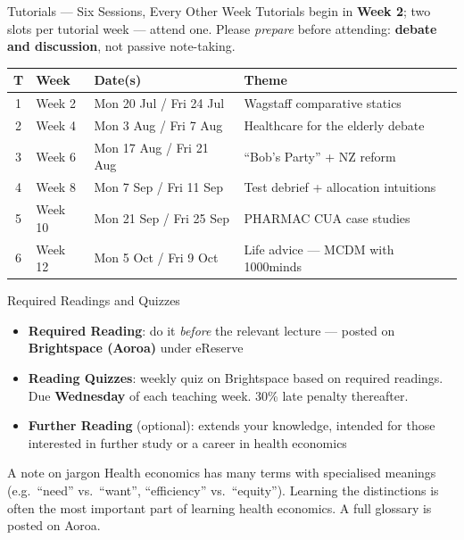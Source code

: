 \documentclass[aspectratio=169, 12pt]{beamer}
\begin{document}
\begin{frame}{Tutorials --- Six Sessions, Every Other Week}
  \small
  Tutorials begin in \textbf{Week 2}; two slots per tutorial week --- attend one.
  Please \emph{prepare} before attending: \textbf{debate and discussion}, not passive note-taking.

  \vspace{0.3em}
  \begin{center}
  \begin{tabular}{@{}clll@{}}
    \toprule
    \textbf{T} & \textbf{Week} & \textbf{Date(s)} & \textbf{Theme} \\
    \midrule
    1 & Week 2  & Mon 20 Jul / Fri 24 Jul  & Wagstaff comparative statics \\
    2 & Week 4  & Mon 3 Aug / Fri 7 Aug    & Healthcare for the elderly debate \\
    3 & Week 6  & Mon 17 Aug / Fri 21 Aug  & ``Bob's Party'' + NZ reform \\
    4 & Week 8  & Mon 7 Sep / Fri 11 Sep   & Test debrief + allocation intuitions \\
    5 & Week 10 & Mon 21 Sep / Fri 25 Sep  & PHARMAC CUA case studies \\
    6 & Week 12 & Mon 5 Oct / Fri 9 Oct    & Life advice --- MCDM with 1000minds \\
    \bottomrule
  \end{tabular}
  \end{center}
\end{frame}

\begin{frame}{Required Readings and Quizzes}
  \begin{itemize}
    \item \textbf{Required Reading}: do it \emph{before} the relevant lecture ---
          posted on \textbf{Brightspace (Aoroa)} under eReserve
    \item \textbf{Reading Quizzes}: weekly quiz on Brightspace based on required readings.
          Due \textbf{Wednesday} of each teaching week. 30\% late penalty thereafter.
    \item \textbf{Further Reading} (optional): extends your knowledge, intended for those
          interested in further study or a career in health economics
  \end{itemize}
  \vspace{0.4em}
  \begin{block}{A note on jargon}
    Health economics has many terms with specialised meanings (e.g.\ ``need'' vs.\ ``want'',
    ``efficiency'' vs.\ ``equity''). Learning the distinctions is often the most important
    part of learning health economics. A full glossary is posted on Aoroa.
  \end{block}
\end{frame}
\end{document}
